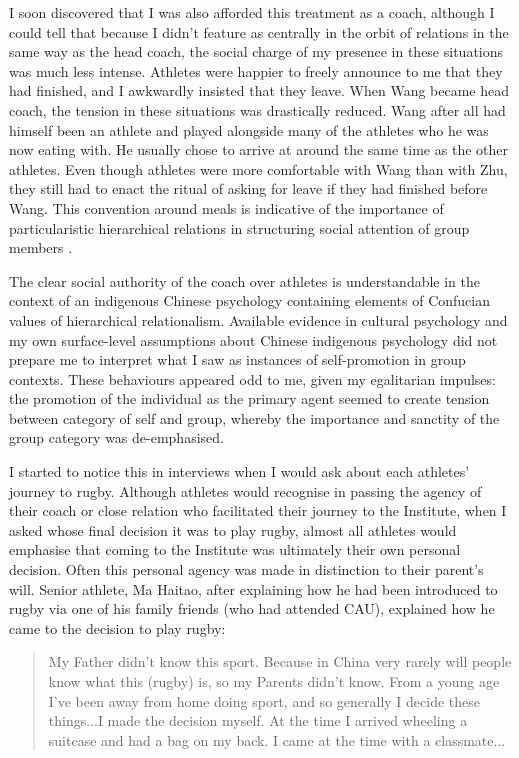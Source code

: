 \begin{CJK}{UTF8}{gbsn}
I soon discovered that I was also afforded this treatment as a coach, although I could tell that because I didn't feature as centrally in the orbit of relations in the same way as the head coach, the social charge of my presence in these situations was much less intense.  Athletes were happier to freely announce to me that they had finished, and I awkwardly insisted that they leave.  When Wang became head coach, the tension in these situations was drastically reduced. Wang after all had himself been an athlete and played alongside many of the athletes who he was now eating with.  He usually chose to arrive at around the same time as the other athletes.  Even though athletes were more comfortable with Wang than with Zhu, they still had to enact the ritual of asking for leave if they had finished before Wang.  This convention around meals is indicative of the importance of particularistic hierarchical relations in structuring social attention of group members \citep{Liu2009}.

The clear social authority of the coach over athletes is understandable in the context of an indigenous Chinese psychology containing elements of Confucian values of hierarchical relationalism.
Available evidence in cultural psychology and my own surface-level assumptions about Chinese indigenous psychology did not prepare me to interpret what I saw as instances of self-promotion in group contexts.  These behaviours appeared odd to me, given my egalitarian impulses: the promotion of the individual as the primary agent seemed to create tension between category of self and group, whereby the importance and sanctity of the group category was de-emphasised.

I started to notice this in interviews when I would ask about each athletes' journey to rugby.  Although athletes would recognise in passing the agency of their coach or close relation who facilitated their journey to the Institute, when I asked whose final decision it was to play rugby, almost all athletes would emphasise that coming to the Institute was ultimately their own personal decision.  Often this personal agency was made in distinction to their parent's will.  Senior athlete, Ma Haitao, after explaining how he had been introduced to rugby via one of his family friends (who had attended CAU), explained how he came to the decision to play rugby:

  \begin{quotation}
    My Father didn't know this sport.  Because in China very rarely will people know what this (rugby) is, so my Parents didn't know. From a young age I've been away from home doing sport, and so generally I decide these things...I made the decision myself.  At the time I arrived wheeling a suitcase and had a bag on my back.  I came at the time with a classmate...
  \end{quotation}


\end{CJK}
